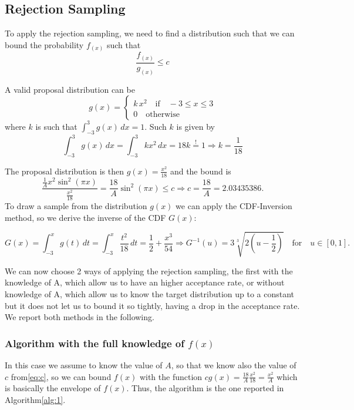 \documentclass[a4paper,12pt]{article}
\begin{document}
\subsection*{Rejection Sampling}
To apply the rejection sampling, we need to find a distribution such that we can bound the probability $f_(x)$ such that
\begin{equation*}
  \frac{f_(x)}{g_(x)} \leq c
\end{equation*}

A valid proposal distribution can be
\begin{equation*}
  g(x) =
  \begin{cases}
    k \, x^2 \quad \text{if} \quad -3\leq x\leq3 \\
    0 \quad \text{otherwise}
  \end{cases}
\end{equation*}
where $k$ is such that $\int_{-3}^{3} g(x) \, dx =1$.
Such $k$ is given by
\begin{equation*}
  \int_{-3}^{3} g(x) \, dx =\int_{-3}^{3} kx^2 \, dx =  18k \overset{!}{=} 1 \Rightarrow k = \frac{1}{18}
\end{equation*}

The proposal distribution is then $g(x) = \frac{x^2}{18}$ and the bound is
\begin{equation}
  \label{eq:c}
  \frac{\frac{1}{A}x^2\sin^2(\pi x)}{\frac{x^2}{18}} = \frac{18}{A}\sin^2(\pi x) \leq c \Rightarrow c = \frac{18}{A} = 2.03435386.
\end{equation}
To draw a sample from the distribution $g(x)$ we can apply the CDF-Inversion method, so we derive the inverse of the CDF $G(x)$:

\begin{equation*}
  G(x) = \int_{-3}^{x}g(t)\,dt = \int_{-3}^{x} \frac{t^2}{18}\,dt = \frac{1}{2}+\frac{x^3}{54}
  \Rightarrow G^{-1}(u) = 3\sqrt[3]{2(u-\frac{1}{2})} \quad \text{for}\quad u \in [0,1].
\end{equation*}

We can now choose 2 ways of applying the rejection sampling, the first with the knowledge of A, which allow us to have an higher acceptance rate, or without knowledge of A, which allow us to know the target distribution up to a constant but it does not let us to bound it so tightly, having a drop in the acceptance rate. We report both methods in the following.

\subsubsection*{Algorithm with the full knowledge of $f(x)$}
In this case we assume to know the value of $A$, so that we know also the value of $c$ from\ref{eq:c}, so we can bound $f(x)$ with the function $cg(x) = \frac{18}{A}\frac{x^2}{18} =\frac{x^2}{A}$ which is basically the envelope of $f(x)$.
Thus, the algorithm is the one reported in Algorithm\ref{alg:1}.
\end{document}
